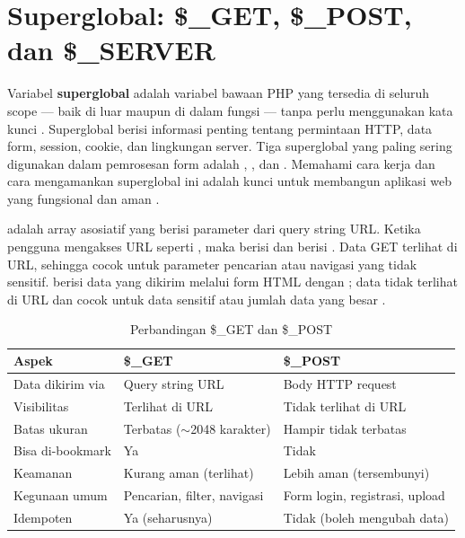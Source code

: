 ﻿\section{Superglobal: \$\_GET, \$\_POST, dan \$\_SERVER}

Variabel \textbf{superglobal} adalah variabel bawaan PHP yang tersedia di seluruh scope --- baik di luar maupun di dalam fungsi --- tanpa perlu menggunakan kata kunci . Superglobal berisi informasi penting tentang permintaan HTTP, data form, session, cookie, dan lingkungan server. Tiga superglobal yang paling sering digunakan dalam pemrosesan form adalah , , dan . Memahami cara kerja dan cara mengamankan superglobal ini adalah kunci untuk membangun aplikasi web yang fungsional dan aman \cite{phpManual}.

 adalah array asosiatif yang berisi parameter dari query string URL. Ketika pengguna mengakses URL seperti , maka  berisi  dan  berisi . Data GET terlihat di URL, sehingga cocok untuk parameter pencarian atau navigasi yang tidak sensitif.  berisi data yang dikirim melalui form HTML dengan ; data tidak terlihat di URL dan cocok untuk data sensitif atau jumlah data yang besar \cite{w3schoolsPhp}.

\begin{table}[H]
\centering
\begin{tabular}{|P{2.5cm}|P{4.5cm}|P{4.5cm}|}
\hline
\textbf{Aspek} & \textbf{\$\_GET} & \textbf{\$\_POST} \\
\hline
Data dikirim via & Query string URL & Body HTTP request \\
\hline
Visibilitas & Terlihat di URL & Tidak terlihat di URL \\
\hline
Batas ukuran & Terbatas ($\sim$2048 karakter) & Hampir tidak terbatas \\
\hline
Bisa di-bookmark & Ya & Tidak \\
\hline
Keamanan & Kurang aman (terlihat) & Lebih aman (tersembunyi) \\
\hline
Kegunaan umum & Pencarian, filter, navigasi & Form login, registrasi, upload \\
\hline
Idempoten & Ya (seharusnya) & Tidak (boleh mengubah data) \\
\hline
\end{tabular}
\caption{Perbandingan \$\_GET dan \$\_POST}
\end{table}


